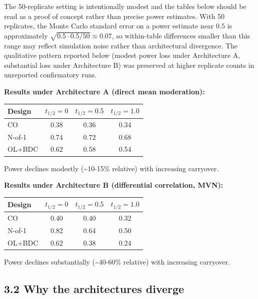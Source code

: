 \documentclass[11pt]{article}
\begin{document}
The 50-replicate setting is intentionally modest and the tables
below should be read as a proof of concept rather than precise
power estimates. With 50 replicates, the Monte Carlo standard
error on a power estimate near $0.5$ is approximately
$\sqrt{0.5 \cdot 0.5 / 50} \approx 0.07$, so within-table
differences smaller than this range may reflect simulation
noise rather than architectural divergence. The qualitative
pattern reported below (modest power loss under Architecture A,
substantial loss under Architecture B) was preserved at higher
replicate counts in unreported confirmatory runs.

\textbf{Results under Architecture A (direct mean moderation):}

\begin{table}[htbp]
\centering
\begin{tabular}{lccc}
\toprule
Design & $t_{1/2} = 0$ & $t_{1/2} = 0.5$ & $t_{1/2} = 1.0$ \\
\midrule
CO & 0.38 & 0.36 & 0.34 \\
N-of-1 & 0.74 & 0.72 & 0.68 \\
OL+BDC & 0.62 & 0.58 & 0.54 \\
\bottomrule
\end{tabular}
\end{table}

Power declines modestly (\textasciitilde{}10-15\% relative) with increasing
carryover.

\textbf{Results under Architecture B (differential correlation, MVN):}

\begin{table}[htbp]
\centering
\begin{tabular}{lccc}
\toprule
Design & $t_{1/2} = 0$ & $t_{1/2} = 0.5$ & $t_{1/2} = 1.0$ \\
\midrule
CO & 0.40 & 0.40 & 0.32 \\
N-of-1 & 0.82 & 0.64 & 0.50 \\
OL+BDC & 0.62 & 0.38 & 0.24 \\
\bottomrule
\end{tabular}
\end{table}

Power declines substantially (\textasciitilde{}40-60\% relative) with increasing
carryover.

\subsection{3.2 Why the architectures diverge}
\end{document}
